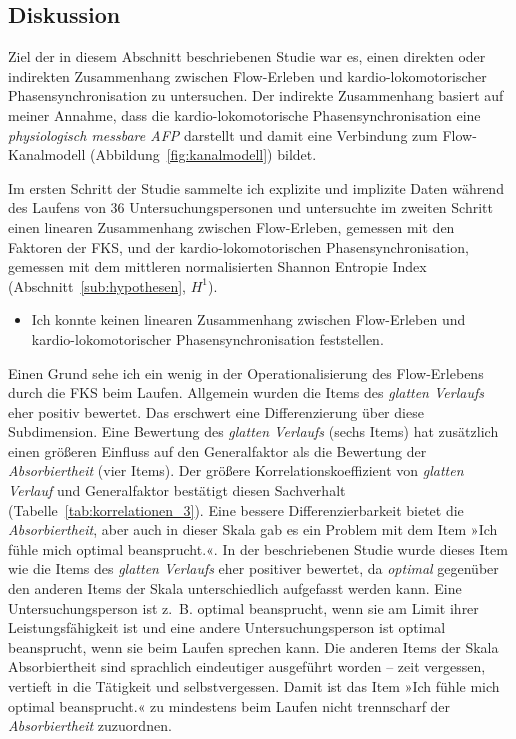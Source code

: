 \subsection{Diskussion} 

\label{sub:diskussion_5_3}

Ziel der in diesem Abschnitt beschriebenen Studie war es, einen direkten oder indirekten Zusammenhang zwischen Flow-Erleben und kardio-lokomotorischer Phasensynchronisation zu untersuchen. Der indirekte Zusammenhang basiert auf meiner Annahme, dass die kardio-lokomotorische Phasensynchronisation eine \emph{physiologisch messbare \ac{AFP}} darstellt und damit eine Verbindung zum Flow-Kanalmodell (Abbildung~\ref{fig:kanalmodell}) bildet. 

Im ersten Schritt der Studie sammelte ich explizite und implizite Daten während des Laufens von 36 Untersuchungspersonen und untersuchte im zweiten Schritt einen linearen Zusammenhang zwischen Flow-Erleben, gemessen mit den Faktoren der \ac{FKS}, und der kardio-lokomotorischen Phasensynchronisation, gemessen mit dem mittleren normalisierten Shannon Entropie Index (Abschnitt~\ref{sub:hypothesen}, $H^1$). 
\begin{itemize}
	
	\item Ich konnte keinen linearen Zusammenhang zwischen Flow-Erleben und kardio-lokomotorischer Phasensynchronisation feststellen.
\end{itemize}

Einen Grund sehe ich ein wenig in der Operationalisierung des Flow-Erlebens durch die \ac{FKS} beim Laufen. Allgemein wurden die Items des \emph{glatten Verlaufs} eher positiv bewertet. Das erschwert eine Differenzierung über diese Subdimension. Eine Bewertung des \emph{glatten Verlaufs} (sechs Items) hat zusätzlich einen größeren Einfluss auf den Generalfaktor als die Bewertung der \emph{Absorbiertheit} (vier Items). Der größere Korrelationskoeffizient von \emph{glatten Verlauf} und Generalfaktor bestätigt diesen Sachverhalt (Tabelle~\ref{tab:korrelationen_3}). Eine bessere Differenzierbarkeit bietet die \emph{Absorbiertheit}, aber auch in dieser Skala gab es ein Problem mit dem Item »Ich fühle mich optimal beansprucht.«. In der beschriebenen Studie wurde dieses Item wie die Items des \emph{glatten Verlaufs} eher positiver bewertet, da \emph{optimal} gegenüber den anderen Items der Skala unterschiedlich aufgefasst werden kann. Eine Untersuchungsperson ist z.~B. optimal beansprucht, wenn sie am Limit ihrer Leistungsfähigkeit ist und eine andere Untersuchungsperson ist optimal beansprucht, wenn sie beim Laufen sprechen kann. Die anderen Items der Skala Absorbiertheit sind sprachlich eindeutiger ausgeführt worden -- zeit vergessen, vertieft in die Tätigkeit und selbstvergessen. Damit ist das Item »Ich fühle mich optimal beansprucht.« zu mindestens beim Laufen nicht trennscharf der \emph{Absorbiertheit} zuzuordnen. 

